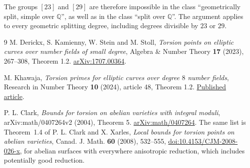 \documentclass[11pt]{article}
\newcommand{\Q}{\mathbb Q}
\begin{document}
The groups
\href{https://genus-2-torsion.github.io/group.html?g=23}{\([23]\)}
and
\href{https://genus-2-torsion.github.io/group.html?g=29}{\([29]\)}
are therefore impossible in the class ``geometrically split, simple
over \(\Q\)'', as well as in the class ``split over \(\Q\)''.
The argument applies to every geometric splitting degree, including
degrees divisible by \(23\) or \(29\).

\begin{thebibliography}{9}
M. Derickx, S. Kamienny, W. Stein and M. Stoll,
\emph{Torsion points on elliptic curves over number fields of small
degree}, Algebra \& Number Theory \textbf{17} (2023), 267--308, Theorem 1.2.
\href{https://arxiv.org/pdf/1707.00364}{arXiv:1707.00364}.

M. Khawaja,
\emph{Torsion primes for elliptic curves over degree \(8\) number fields},
Research in Number Theory \textbf{10} (2024), article 48, Theorem 1.2.
\href{https://eprints.whiterose.ac.uk/id/eprint/211212/8/s40993-024-00533-6.pdf}{Published article}.

P. L. Clark,
\emph{Bounds for torsion on abelian varieties with integral moduli},
arXiv:math/0407264v2 (2004), Theorem 5.
\href{https://arxiv.org/pdf/math/0407264}{arXiv:math/0407264}.
The same list is Theorem~1.4 of P. L. Clark and X. Xarles, \emph{Local bounds for torsion points on abelian varieties}, Canad. J. Math. \textbf{60} (2008), 532--555, \href{https://doi.org/10.4153/CJM-2008-026-x}{doi:10.4153/CJM-2008-026-x}, for abelian surfaces with everywhere anisotropic reduction, which includes potentially good reduction.
\end{thebibliography}
\end{document}
